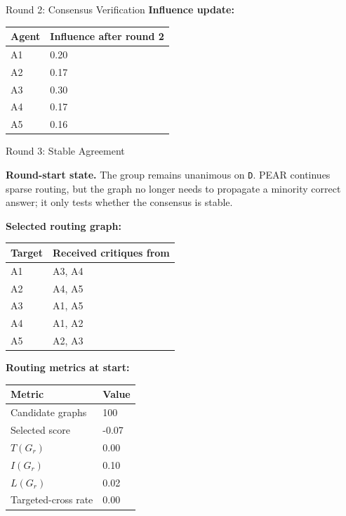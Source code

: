\begin{roundbox}{Round 2: Consensus Verification}
\textbf{Influence update:}
\begin{center}
\footnotesize
\begin{tabular}{@{}ll@{}}
\toprule
Agent & Influence after round 2 \\
\midrule
A1 & 0.20 \\
A2 & 0.17 \\
A3 & 0.30 \\
A4 & 0.17 \\
A5 & 0.16 \\
\bottomrule
\end{tabular}
\end{center}

\end{roundbox}

\begin{roundbox}{Round 3: Stable Agreement}

\textbf{Round-start state.} The group remains unanimous on \texttt{D}. PEAR continues sparse routing, but the graph no longer needs to propagate a minority correct answer; it only tests whether the consensus is stable.

\vspace{1mm}
\textbf{Selected routing graph:}
\begin{center}
\footnotesize
\begin{tabular}{@{}ll@{}}
\toprule
Target & Received critiques from \\
\midrule
A1 & A3, A4 \\
A2 & A4, A5 \\
A3 & A1, A5 \\
A4 & A1, A2 \\
A5 & A2, A3 \\
\bottomrule
\end{tabular}
\end{center}

\textbf{Routing metrics at start:}
\begin{center}
\footnotesize
\begin{tabular}{@{}ll@{}}
\toprule
Metric & Value \\
\midrule
Candidate graphs & 100 \\
Selected score & -0.07 \\
$T(G_r)$ & 0.00 \\
$I(G_r)$ & 0.10 \\
$L(G_r)$ & 0.02 \\
Targeted-cross rate & 0.00 \\
\bottomrule
\end{tabular}
\end{center}


\end{roundbox}

